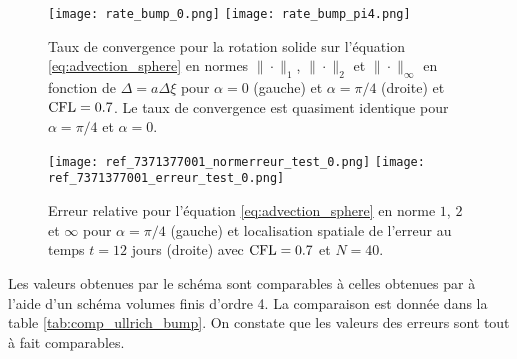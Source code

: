 \begin{figure}[htbp]
\begin{center}
\texttt{[image: rate\_bump\_0.png]}
\texttt{[image: rate\_bump\_pi4.png]}
\end{center}
\caption{Taux de convergence pour la rotation solide sur l'équation \eqref{eq:advection_sphere} en normes $\| \cdot\|_1$, $\| \cdot\|_2$ et $\| \cdot\|_{\infty}$ en fonction de $\Delta = a \Delta \xi$ pour $\alpha = 0$ (gauche) et $\alpha = \pi / 4$ (droite) et $\text{CFL} = 0.7$. Le taux de convergence est quasiment identique pour $\alpha = \pi/4$ et $\alpha=0$.}
\label{fig:rate_bump}
\end{figure}

\begin{figure}[htbp]
\begin{center}
\texttt{[image: ref\_7371377001\_normerreur\_test\_0.png]}
\texttt{[image: ref\_7371377001\_erreur\_test\_0.png]}
\end{center}
\caption{Erreur relative pour l'équation \eqref{eq:advection_sphere} en norme $1$, $2$ et $\infty$ pour $\alpha = \pi/4$ (gauche) et localisation spatiale de l'erreur au temps $t=12$ jours (droite) avec $\text{CFL} = 0.7$ et $N=40$.}
\label{fig:erreur_bump}
\end{figure}

Les valeurs obtenues par le schéma sont comparables à celles obtenues par \cite{Ullrich2010, Ullrich2011} à l'aide d'un schéma volumes finis d'ordre 4. La comparaison est donnée dans la table \ref{tab:comp_ullrich_bump}. On constate que les valeurs des erreurs sont tout à fait comparables.

